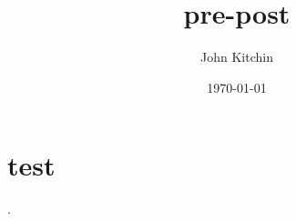 \documentclass{elsarticle}
\author{John Kitchin}
\date{\today}
\title{pre-post}
\begin{document}
\tableofcontents


\section{test}
\label{sec-1}



\cite[See page 20][for example]{Dominik201408}.



\end{document}
